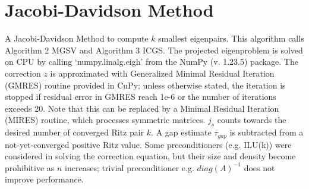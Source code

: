 \documentclass[a4paper]{article}
\begin{document}
\pagebreak
\section{Jacobi-Davidson Method}

A Jacobi-Davidson Method to compute $k$ smallest eigenpairs. This algorithm calls Algorithm 2 MGSV and Algorithm 3 ICGS. The projected eigenproblem is solved on CPU by calling ‘numpy.linalg.eigh’ from the NumPy (v. 1.23.5) package. The correction $z$ is approximated with Generalized Minimal Residual Iteration (GMRES) routine provided in CuPy; unless otherwise stated, the iteration is stopped if residual error in GMRES reach 1e-6 or the number of iterations exceeds 20. Note that this can be replaced by a Minimal Residual Iteration (MIRES) routine, which processes symmetric matrices. $j_s$ counts towards the desired number of converged Ritz pair $k$. A gap estimate $\tau_{gap}$ is subtracted from a not-yet-converged positive Ritz value. Some preconditioners (e.g. ILU(k)) were considered in solving the correction equation, but their size and density become prohibitive as $n$ increases; trivial preconditioner e.g. $diag(A)^{-1}$ does not improve performance.
\end{document}
